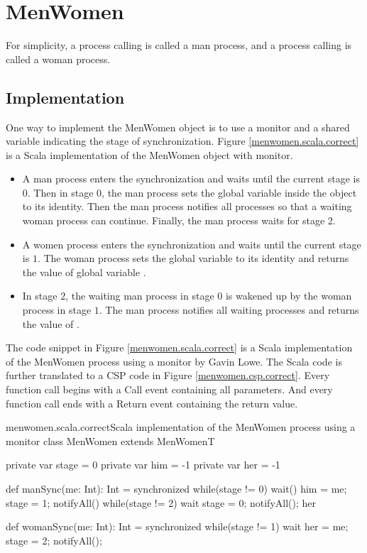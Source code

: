 \documentclass{article}
\begin{document}
\section{MenWomen}
For simplicity, a process calling  is called a man process, and a process calling  is called a woman process. 

\subsection{Implementation}
One way to implement the MenWomen object is to use a monitor and a shared variable indicating the stage of synchronization. Figure \ref{menwomen.scala.correct} is a Scala implementation of the MenWomen object with monitor.
\begin{itemize}
  \item A man process enters the synchronization and waits until the current stage is $0$. Then in stage $0$, the man process sets the global variable  inside the  object to its identity. Then the man process notifies all processes so that a waiting woman process can continue. Finally, the man process waits for stage 2.
  \item A women process enters the synchronization and waits until the current stage is $1$. The woman process sets the global variable  to its identity and returns the value of global variable .
  \item In stage $2$, the waiting man process in stage $0$ is wakened up by the woman process in stage $1$. The man process notifies all waiting processes and returns the value of .
\end{itemize}

The code snippet in Figure \ref{menwomen.scala.correct} is a Scala implementation of the MenWomen process using a monitor by Gavin Lowe. The Scala code is further translated to a CSP code in Figure \ref{menwomen.csp.correct}. Every function call begins with a Call event containing all parameters. And every function call ends with a Return event containing the return value.

\begin{scalafloat}{menwomen.scala.correct}{Scala implementation of the MenWomen process using a monitor}
class MenWomen extends MenWomenT{
  private var stage = 0
  private var him = -1
  private var her = -1

  def manSync(me: Int): Int = synchronized{
    while(stage != 0) wait()         
    him = me; stage = 1; notifyAll() 
    while(stage != 2) wait
    stage = 0; notifyAll(); her
  }

  def womanSync(me: Int): Int = synchronized{
    while(stage != 1) wait
    her = me; stage = 2; notifyAll();
  }
}
\end{scalafloat}
\end{document}
